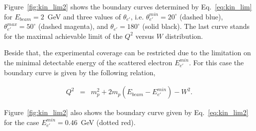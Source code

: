 Figure~\ref{fig:kin_lim2} shows the boundary curves determined by Eq.~\eqref{eq:kin_lim} for $E_{beam} = 2$~GeV and three values of $\theta_{e'}$, i.e. $\theta_{e'}^{min}=20^{\circ}$ (dashed blue), $\theta_{e'}^{max}=50^{\circ}$ (dashed magenta), and $\theta_{e'}=180^{\circ}$ (solid black). The last curve stands for the  maximal achievable limit of the $Q^{2}$ versus $W$ distribution.

Beside that, the experimental coverage can be restricted due to the limitation on the minimal detectable energy of the scattered electron $E_{e'}^{min}$. For this case the boundary curve is given by the following relation,

\begin{eqnarray}
Q^2 &=& m_{p}^{2}+2m_{p}(E_{beam} - E_{e'}^{min}) -W^{2}.\label{eq:kin_lim2}
\end{eqnarray}
 
Figure~\ref{fig:kin_lim2} also shows the boundary curve given by Eq.~\eqref{eq:kin_lim2} for the case $E_{e'}^{min}=0.46$~GeV (dotted red).






